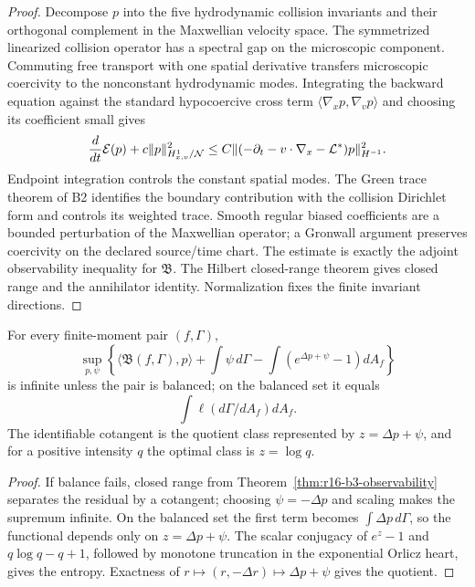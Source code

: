 \begin{proof}
Decompose \(p\) into the five hydrodynamic collision invariants and their
orthogonal complement in the Maxwellian velocity space.  The symmetrized
linearized collision operator has a spectral gap on the microscopic
component.  Commuting free transport with one spatial derivative transfers
microscopic coercivity to the nonconstant hydrodynamic modes.  Integrating the
backward equation against the standard hypocoercive cross term
\(\langle\nabla_x p,\nabla_v p\rangle\) and choosing its coefficient small
gives
\[
 {d\over dt}\mathcal E(p)+c\|p\|_{H^1_{x,v}/\mathcal N}^2
 \le C\|(-\partial_t-v\cdot\nabla_x-\mathcal L^*)p\|_{H^{-1}}^2.
\]
Endpoint integration controls the constant spatial modes.  The Green trace
theorem of B2 identifies the boundary contribution with the collision
Dirichlet form and controls its weighted trace.  Smooth regular biased
coefficients are a bounded perturbation of the Maxwellian operator; a
Gronwall argument preserves coercivity on the declared source/time chart.
The estimate is exactly the adjoint observability inequality for
\(\mathfrak B\).  The Hilbert closed-range theorem gives closed range and the
annihilator identity.  Normalization fixes the finite invariant directions.
\end{proof}

\begin{theorem}
\label{thm:r16-b3-duality}
For every finite-moment pair \((f,\Gamma)\),
\[
 \sup_{p,\psi}\left\{
 \langle\mathfrak B(f,\Gamma),p\rangle
 +\int\psi\,d\Gamma
 -\int(e^{\Delta p+\psi}-1)dA_f
 \right\}
\]
is infinite unless the pair is balanced; on the balanced set it equals
\[
 \int\ell(d\Gamma/dA_f)dA_f.
\]
The identifiable cotangent is the quotient class represented by
\(z=\Delta p+\psi\), and for a positive intensity \(q\) the optimal class is
\(z=\log q\).
\end{theorem}

\begin{proof}
If balance fails, closed range from
Theorem~\ref{thm:r16-b3-observability} separates the residual by a cotangent;
choosing \(\psi=-\Delta p\) and scaling makes the supremum infinite.  On the
balanced set the first term becomes \(\int\Delta p\,d\Gamma\), so the
functional depends only on \(z=\Delta p+\psi\).  The scalar conjugacy of
\(e^z-1\) and \(q\log q-q+1\), followed by monotone truncation in the
exponential Orlicz heart, gives the entropy.  Exactness of
\(r\mapsto(r,-\Delta r)\mapsto\Delta p+\psi\) gives the quotient.
\end{proof}

